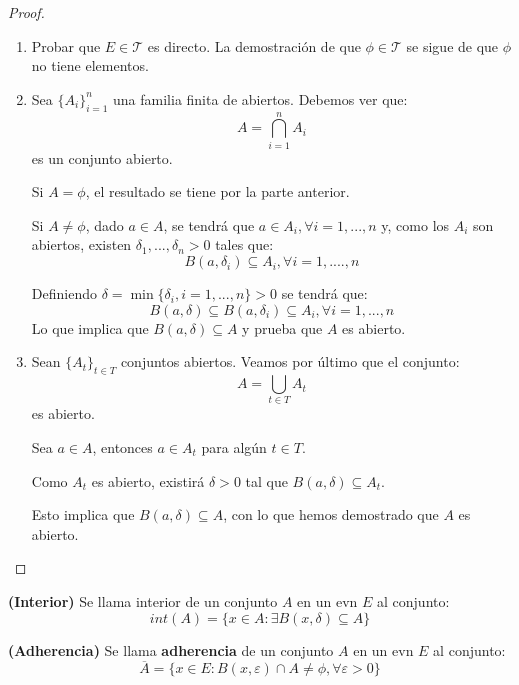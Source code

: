 \begin{proof}
	\begin{enumerate}
		\item Probar que $E \in \mathcal{T}$ es directo. La demostración de que $\phi \in \mathcal{T}$ se sigue de que $\phi$ no tiene elementos. 
		
		\item Sea $\{A_i\}_{i=1}^n$ una familia finita de abiertos. Debemos ver que: 
		$$ A = \bigcap_{i=1}^n A_i $$ 
		es un conjunto abierto.   
		
		Si $A = \phi$, el resultado se tiene por la parte anterior.   
		
		Si $A \neq \phi$, dado $a \in A$, se tendrá que $a \in A_i, \forall i = 1, ... , n$ y, como los $A_i$ son abiertos, existen $\delta_1, ... , \delta_n > 0$ tales que: $$ B(a, \delta_i) \subseteq A_i, \forall i= 1, ...., n$$  
		
		Definiendo $\delta = \min \{ \delta_i , i = 1, ... , n \} > 0$ se tendrá que: $$B(a, \delta) \subseteq B(a, \delta_i) \subseteq A_i, \forall i = 1 , ... , n$$  
		Lo que implica que $B(a, \delta) \subseteq A$ y prueba que $A$ es abierto. 
		
		\item Sean $\{A_t\}_{t\in T}$ conjuntos abiertos. Veamos por último que el conjunto: 
		$$ A = \bigcup_{t\in T} A_t$$ 
		es abierto.   
		
		Sea $a \in A$, entonces $a \in A_t$ para algún $t \in T$.   
		
		Como $A_t$ es abierto, existirá $\delta > 0$ tal que $B(a , \delta) \subseteq A_t$.   
		
		Esto implica que $B(a, \delta) \subseteq A$, con lo que hemos demostrado que $A$ es abierto.
	\end{enumerate}
\end{proof}


\begin{definicion}
	\textbf{(Interior)}
	Se llama interior de un conjunto $A$ en un evn $E$ al conjunto: 
	$$ int(A) = \{ x \in A: \exists B(x, \delta) \subseteq A \} $$ 
\end{definicion}

\begin{definicion}
	\textbf{(Adherencia)}
	Se llama \textbf{adherencia} de un conjunto $A$ en un evn $E$ al conjunto: 
	$$ \overline{A} = \{ x \in E: B(x, \varepsilon) \cap A \neq \phi , \forall \varepsilon > 0 \}$$ 	
\end{definicion}

